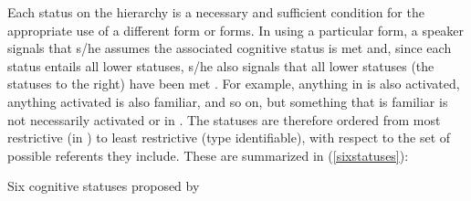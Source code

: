 \begin{table} 

\caption{{Givenness Hierarchy (Gundel et. al.1993)}}
\label{givennesshierarchy} 

\end{table}
Each status on the hierarchy is a necessary and sufficient condition for the appropriate use of a different form or forms. In using a particular form, a speaker signals that s/he assumes the associated cognitive status is met and, since each status entails all lower statuses, s/he also signals that all lower statuses (the statuses to the right) have been met \citep[275]{gundel1993}. For example, anything in  is also activated, anything activated is also familiar, and so on, but something that is familiar is not necessarily activated or in . The statuses are therefore ordered from most restrictive (in ) to least restrictive (type identifiable), with respect to the set of possible referents they include. These are summarized in (\ref{sixstatuses}):

\ea\label{sixstatuses} Six cognitive statuses proposed by \citet{gundel1993}

